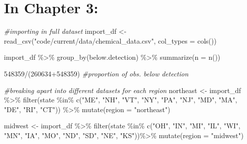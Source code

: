 \documentclass[12pt, twoside]{amherstthesis}
\newenvironment{Shaded}{\begin{snugshade}}{\end{snugshade}}
\newcommand{\AttributeTok}[1]{\textcolor[rgb]{0.77,0.63,0.00}{#1}}
\newcommand{\CommentTok}[1]{\textcolor[rgb]{0.56,0.35,0.01}{\textit{#1}}}
\newcommand{\DecValTok}[1]{\textcolor[rgb]{0.00,0.00,0.81}{#1}}
\newcommand{\FunctionTok}[1]{\textcolor[rgb]{0.00,0.00,0.00}{#1}}
\newcommand{\NormalTok}[1]{#1}
\newcommand{\OtherTok}[1]{\textcolor[rgb]{0.56,0.35,0.01}{#1}}
\newcommand{\SpecialCharTok}[1]{\textcolor[rgb]{0.00,0.00,0.00}{#1}}
\newcommand{\StringTok}[1]{\textcolor[rgb]{0.31,0.60,0.02}{#1}}
\begin{document}
\hypertarget{in-chapter-3}{%
\section{In Chapter 3:}\label{in-chapter-3}}
\begin{Shaded}
\begin{Highlighting}[]
\CommentTok{\#importing in full dataset}
\NormalTok{import\_df }\OtherTok{\textless{}{-}} \FunctionTok{read\_csv}\NormalTok{(}\StringTok{"code/current/data/chemical\_data.csv"}\NormalTok{, }\AttributeTok{col\_types =} \FunctionTok{cols}\NormalTok{())}

\NormalTok{import\_df }\SpecialCharTok{\%\textgreater{}\%}
  \FunctionTok{group\_by}\NormalTok{(below.detection) }\SpecialCharTok{\%\textgreater{}\%}
  \FunctionTok{summarize}\NormalTok{(}\AttributeTok{n =} \FunctionTok{n}\NormalTok{())}

\DecValTok{548359}\SpecialCharTok{/}\NormalTok{(}\DecValTok{260634}\SpecialCharTok{+}\DecValTok{548359}\NormalTok{) }\CommentTok{\#proportion of obs. below detection}

\CommentTok{\#breaking apart into different datasets for each region}
\NormalTok{northeast }\OtherTok{\textless{}{-}}\NormalTok{ import\_df }\SpecialCharTok{\%\textgreater{}\%}
  \FunctionTok{filter}\NormalTok{(state }\SpecialCharTok{\%in\%} \FunctionTok{c}\NormalTok{(}\StringTok{"ME"}\NormalTok{, }\StringTok{"NH"}\NormalTok{, }\StringTok{"VT"}\NormalTok{, }\StringTok{"NY"}\NormalTok{, }\StringTok{"PA"}\NormalTok{, }\StringTok{"NJ"}\NormalTok{, }\StringTok{"MD"}\NormalTok{, }
                      \StringTok{"MA"}\NormalTok{, }\StringTok{"DE"}\NormalTok{, }\StringTok{"RI"}\NormalTok{, }\StringTok{"CT"}\NormalTok{)) }\SpecialCharTok{\%\textgreater{}\%}
  \FunctionTok{mutate}\NormalTok{(}\AttributeTok{region =} \StringTok{"northeast"}\NormalTok{)}

\NormalTok{midwest }\OtherTok{\textless{}{-}}\NormalTok{ import\_df }\SpecialCharTok{\%\textgreater{}\%}
  \FunctionTok{filter}\NormalTok{(state }\SpecialCharTok{\%in\%} \FunctionTok{c}\NormalTok{(}\StringTok{"OH"}\NormalTok{, }\StringTok{"IN"}\NormalTok{, }\StringTok{"MI"}\NormalTok{, }\StringTok{"IL"}\NormalTok{, }\StringTok{"WI"}\NormalTok{, }\StringTok{"MN"}\NormalTok{, }\StringTok{"IA"}\NormalTok{, }
                      \StringTok{"MO"}\NormalTok{, }\StringTok{"ND"}\NormalTok{, }\StringTok{"SD"}\NormalTok{, }\StringTok{"NE"}\NormalTok{, }\StringTok{"KS"}\NormalTok{))}\SpecialCharTok{\%\textgreater{}\%}
  \FunctionTok{mutate}\NormalTok{(}\AttributeTok{region =} \StringTok{"midwest"}\NormalTok{)}


\end{Highlighting}
\end{Shaded}
\end{document}
